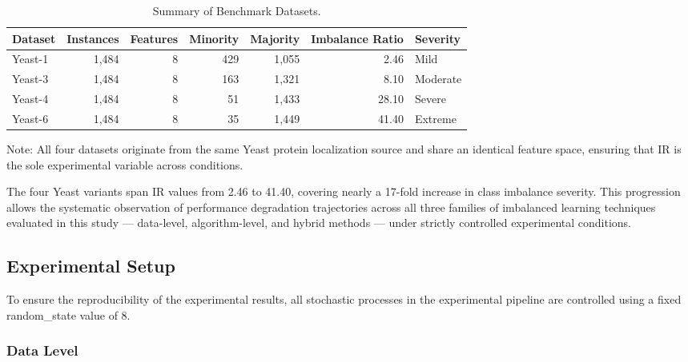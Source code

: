 \documentclass[sigconf]{acmart}
\begin{document}
\begin{table}[t]
  \centering
  \caption{Summary of Benchmark Datasets.}
  \label{tab:datasets}
  \small
  \setlength{\tabcolsep}{12pt} 
  \begin{tabular}{lrrrrrl}
    \toprule
    \textbf{Dataset} & \textbf{Instances} & \textbf{Features} & \textbf{Minority} & \textbf{Majority} & \textbf{Imbalance Ratio} & \textbf{Severity} \\
    \midrule
    Yeast-1 & 1{,}484 & 8 & 429 & 1{,}055 & 2.46 & Mild     \\
    Yeast-3 & 1{,}484 & 8 & 163 & 1{,}321 & 8.10 & Moderate \\
    Yeast-4 & 1{,}484 & 8 &  51 & 1{,}433 & 28.10 & Severe   \\
    Yeast-6 & 1{,}484 & 8 &  35 & 1{,}449 & 41.40 & Extreme  \\
    \bottomrule
  \end{tabular}
\end{table}

Note: All four datasets originate from the same Yeast protein localization source and share an identical feature space, ensuring that IR is the sole experimental variable across conditions. 

The four Yeast variants span IR values from 2.46 to 41.40, covering nearly a 17-fold increase in class imbalance severity. This progression allows the systematic observation of performance degradation trajectories across all three families of imbalanced learning techniques evaluated in this study — data-level, algorithm-level, and hybrid methods — under strictly controlled experimental conditions. 

\subsection{Experimental Setup}

To ensure the reproducibility of the experimental results, all stochastic processes in the experimental pipeline are controlled using a fixed random\_state value of 8. 

\subsubsection{Data Level}~\\
\end{document}

